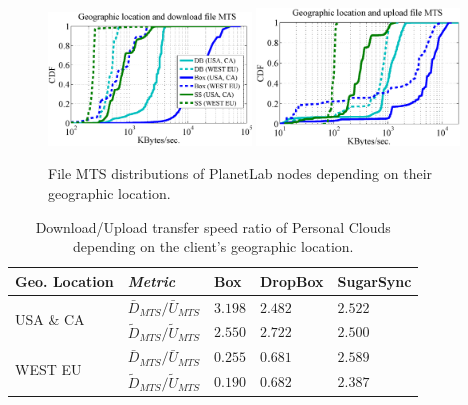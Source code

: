 \begin{figure}[h]
\centering	
{\label{fig:transfer_times_geographic_location_downloads}
\includegraphics[width=0.48\textwidth]{figures/geographic_location_downloads.eps}} 
{\label{fig:transfer_times_geographic_location_uploads}
\includegraphics[width=0.48\textwidth]{figures/geographic_location_uploads.eps}}
	\caption{File MTS distributions of PlanetLab nodes depending on their geographic location.}
	\label{fig:transfer_times_geographic_location}
\end{figure}


\begin{table}[h]
\begin{center}
\begin{tabular}{|l|l|l|l|l|}
\hline
 Geo. Location& \textit{Metric} & Box & DropBox & SugarSync \\ \hline
\multirow{2}{*}{USA \& CA}
 & $\bar{D}_{MTS}/\bar{U}_{MTS}$ & $3.198$ & $2.482$ & $2.522$ \\
 & $\tilde{D}_{MTS}/\tilde{U}_{MTS}$ & $2.550$ & $2.722$ & $2.500$ \\ \hline
\multirow{2}{*}{WEST EU}
 & $\bar{D}_{MTS}/\bar{U}_{MTS}$ & $0.255$ & $0.681$ & $2.589$ \\
 & $\tilde{D}_{MTS}/\tilde{U}_{MTS}$ & $0.190$ & $0.682$ & $2.387$ \\ \hline
\end{tabular}
\caption{Download/Upload transfer speed ratio of Personal Clouds depending on the client's geographic location.}
\vspace{-5mm}
\label{tab:down_up_ratio_location}
\end{center}
\end{table}

